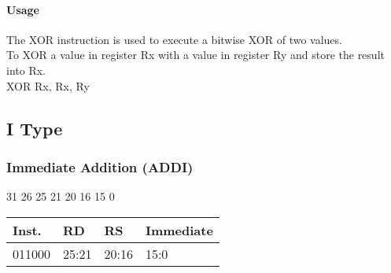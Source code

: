 \documentclass[12pt]{article}
\begin{document}
    \paragraph{Usage}
    \begin{flushleft}
    The XOR instruction is used to execute a bitwise XOR of two values.\\
    \vspace{1em}
    To XOR a value in register Rx with a value in register Ry and store the result into Rx.\\
    \vspace{1em}
    XOR Rx, Rx, Ry
    \end{flushleft}
   
   





\newpage
\subsection{I Type}
    \subsubsection{Immediate Addition (ADDI)}
    
    \hspace{1.6cm}31 \hspace{1.15cm}26 \hspace{.05cm}25 \hspace{.8cm}21 \hspace{.05cm}20 \hspace{.8cm}16 \hspace{.05cm}15 \hspace{6.4cm}0
    \vspace{-.25cm}
    \begin{center}
        \begin{tabular}{ |p{1.8cm}|p{1.5cm}|p{1.5cm}|p{6.8cm}| }
            \hline
            \textbf{Inst.} & \textbf{RD} &  \textbf{RS} & \textbf{Immediate}\\
            \hline
            011000& 25:21 & 20:16 &15:0\\
            \hline
        \end{tabular}
    \end{center}
    
\end{document}
